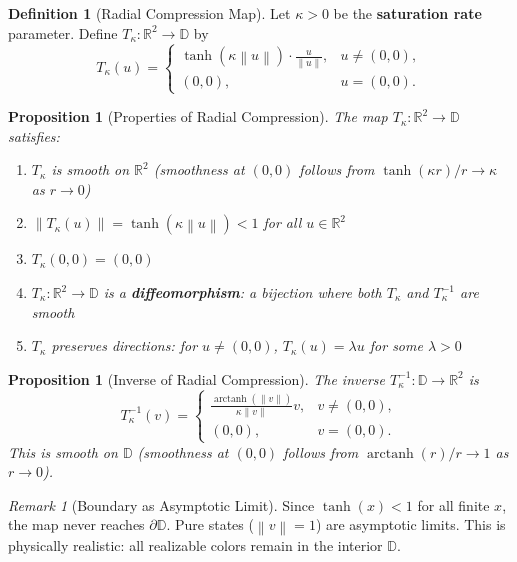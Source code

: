 \documentclass[11pt]{article}
\theoremstyle{plain}
\newtheorem{proposition}[theorem]{Proposition}
\theoremstyle{definition}
\newtheorem{definition}[theorem]{Definition}
\theoremstyle{remark}
\newtheorem{remark}[theorem]{Remark}
\newcommand{\R}{\mathbb{R}}
\newcommand{\D}{\mathbb{D}}
\newcommand{\norm}[1]{\left\lVert #1 \right\rVert}
\DeclareMathOperator{\arctanh}{arctanh}
\begin{document}
\begin{definition}[Radial Compression Map]
\label{def:compression}
Let $\kappa > 0$ be the \textbf{saturation rate} parameter. Define $T_\kappa: \R^2 \to \D$ by
\begin{equation}
\boxed{
T_\kappa(u) = \begin{cases}
\displaystyle \tanh(\kappa \norm{u}) \cdot \frac{u}{\norm{u}}, & u \neq (0,0), \\[0.8em]
(0,0), & u = (0,0).
\end{cases}
}
\end{equation}
\end{definition}

\begin{proposition}[Properties of Radial Compression]
\label{prop:compression-props}
The map $T_\kappa: \R^2 \to \D$ satisfies:
\begin{enumerate}[label=(\roman*)]
    \item $T_\kappa$ is smooth on $\R^2$ (smoothness at $(0,0)$ follows from $\tanh(\kappa r)/r \to \kappa$ as $r \to 0$)
    \item $\norm{T_\kappa(u)} = \tanh(\kappa\norm{u}) < 1$ for all $u \in \R^2$
    \item $T_\kappa(0,0) = (0,0)$
    \item $T_\kappa: \R^2 \to \D$ is a \textbf{diffeomorphism}: a bijection where both $T_\kappa$ and $T_\kappa^{-1}$ are smooth
    \item $T_\kappa$ preserves directions: for $u \neq (0,0)$, $T_\kappa(u) = \lambda u$ for some $\lambda > 0$
\end{enumerate}
\end{proposition}

\begin{proposition}[Inverse of Radial Compression]
\label{prop:inverse-T}
The inverse $T_\kappa^{-1}: \D \to \R^2$ is
\begin{equation}
T_\kappa^{-1}(v) = \begin{cases}
\displaystyle \frac{\arctanh(\norm{v})}{\kappa \norm{v}} v, & v \neq (0,0), \\[0.8em]
(0,0), & v = (0,0).
\end{cases}
\end{equation}
This is smooth on $\D$ (smoothness at $(0,0)$ follows from $\arctanh(r)/r \to 1$ as $r \to 0$).
\end{proposition}

\begin{remark}[Boundary as Asymptotic Limit]
\label{rem:boundary}
Since $\tanh(x) < 1$ for all finite $x$, the map never reaches $\partial \D$. Pure states ($\norm{v} = 1$) are asymptotic limits. This is physically realistic: all realizable colors remain in the interior $\D$.
\end{remark}
\end{document}
